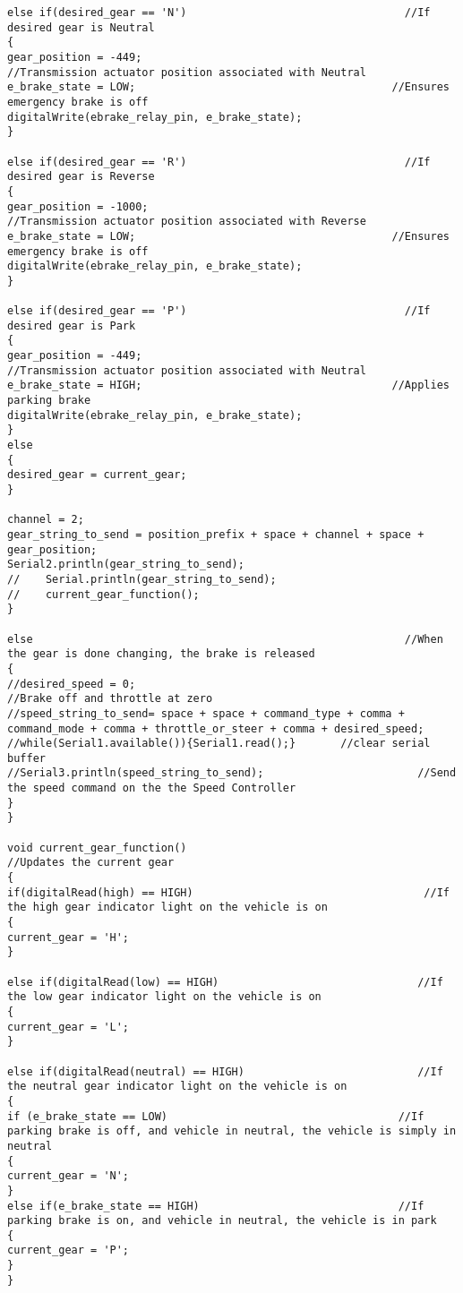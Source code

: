 \begin{lstlisting}[breaklines=true,basicstyle=\tiny]
else if(desired_gear == 'N')                                  //If desired gear is Neutral
{
gear_position = -449;                                       //Transmission actuator position associated with Neutral
e_brake_state = LOW;                                        //Ensures emergency brake is off
digitalWrite(ebrake_relay_pin, e_brake_state);
}

else if(desired_gear == 'R')                                  //If desired gear is Reverse
{
gear_position = -1000;                                      //Transmission actuator position associated with Reverse
e_brake_state = LOW;                                        //Ensures emergency brake is off
digitalWrite(ebrake_relay_pin, e_brake_state);
}

else if(desired_gear == 'P')                                  //If desired gear is Park
{
gear_position = -449;                                       //Transmission actuator position associated with Neutral
e_brake_state = HIGH;                                       //Applies parking brake
digitalWrite(ebrake_relay_pin, e_brake_state);
}
else
{
desired_gear = current_gear;
}

channel = 2; 
gear_string_to_send = position_prefix + space + channel + space + gear_position;
Serial2.println(gear_string_to_send);
//    Serial.println(gear_string_to_send);
//    current_gear_function();
}

else                                                          //When the gear is done changing, the brake is released
{
//desired_speed = 0;                                            //Brake off and throttle at zero
//speed_string_to_send= space + space + command_type + comma + command_mode + comma + throttle_or_steer + comma + desired_speed;
//while(Serial1.available()){Serial1.read();}       //clear serial buffer
//Serial3.println(speed_string_to_send);                        //Send the speed command on the the Speed Controller
}
}

void current_gear_function()                                      //Updates the current gear
{
if(digitalRead(high) == HIGH)                                    //If the high gear indicator light on the vehicle is on
{
current_gear = 'H';                                            
}

else if(digitalRead(low) == HIGH)                               //If the low gear indicator light on the vehicle is on
{
current_gear = 'L';
}

else if(digitalRead(neutral) == HIGH)                           //If the neutral gear indicator light on the vehicle is on
{
if (e_brake_state == LOW)                                    //If parking brake is off, and vehicle in neutral, the vehicle is simply in neutral
{
current_gear = 'N';
}
else if(e_brake_state == HIGH)                               //If parking brake is on, and vehicle in neutral, the vehicle is in park
{
current_gear = 'P';
}
}


\end{lstlisting}
